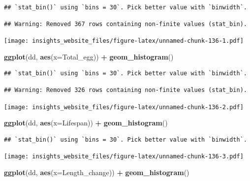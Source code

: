 \documentclass[]{book}
\newenvironment{Shaded}{\begin{snugshade}}{\end{snugshade}}
\newcommand{\DataTypeTok}[1]{\textcolor[rgb]{0.13,0.29,0.53}{#1}}
\newcommand{\KeywordTok}[1]{\textcolor[rgb]{0.13,0.29,0.53}{\textbf{#1}}}
\newcommand{\NormalTok}[1]{#1}
\newcommand{\OperatorTok}[1]{\textcolor[rgb]{0.81,0.36,0.00}{\textbf{#1}}}
\newcommand{\StringTok}[1]{\textcolor[rgb]{0.31,0.60,0.02}{#1}}
\begin{document}
\begin{verbatim}
## `stat_bin()` using `bins = 30`. Pick better value with `binwidth`.
\end{verbatim}

\begin{verbatim}
## Warning: Removed 367 rows containing non-finite values (stat_bin).
\end{verbatim}

\texttt{[image: insights\_website\_files/figure-latex/unnamed-chunk-136-1.pdf]}

\begin{Shaded}
\begin{Highlighting}[]
\KeywordTok{ggplot}\NormalTok{(dd, }\KeywordTok{aes}\NormalTok{(}\DataTypeTok{x=}\NormalTok{Total_egg)) }\OperatorTok{+}
\StringTok{  }\KeywordTok{geom_histogram}\NormalTok{()}
\end{Highlighting}
\end{Shaded}

\begin{verbatim}
## `stat_bin()` using `bins = 30`. Pick better value with `binwidth`.
\end{verbatim}

\begin{verbatim}
## Warning: Removed 326 rows containing non-finite values (stat_bin).
\end{verbatim}

\texttt{[image: insights\_website\_files/figure-latex/unnamed-chunk-136-2.pdf]}

\begin{Shaded}
\begin{Highlighting}[]
\KeywordTok{ggplot}\NormalTok{(dd, }\KeywordTok{aes}\NormalTok{(}\DataTypeTok{x=}\NormalTok{Lifespan)) }\OperatorTok{+}
\StringTok{  }\KeywordTok{geom_histogram}\NormalTok{()}
\end{Highlighting}
\end{Shaded}

\begin{verbatim}
## `stat_bin()` using `bins = 30`. Pick better value with `binwidth`.
\end{verbatim}

\texttt{[image: insights\_website\_files/figure-latex/unnamed-chunk-136-3.pdf]}

\begin{Shaded}
\begin{Highlighting}[]
\KeywordTok{ggplot}\NormalTok{(dd, }\KeywordTok{aes}\NormalTok{(}\DataTypeTok{x=}\NormalTok{Length_change)) }\OperatorTok{+}
\StringTok{  }\KeywordTok{geom_histogram}\NormalTok{()}
\end{Highlighting}
\end{Shaded}
\end{document}
